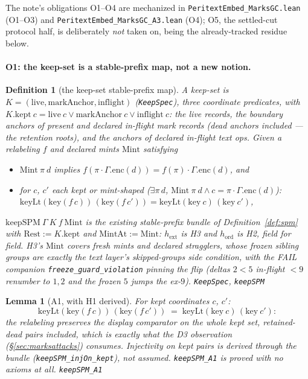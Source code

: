 \documentclass[11pt]{article}
\newtheorem{lemma}[theorem]{Lemma}
\newtheorem{definition}[theorem]{Definition}
\newcommand{\lean}[1]{\texttt{#1}}
\newcommand{\code}[1]{\texttt{#1}}
\begin{document}
The note's obligations O1--O4 are mechanized in
\code{PeritextEmbed\_MarksGC.lean} (O1--O3) and
\code{PeritextEmbed\_MarksGC\_A3.lean} (O4); O5, the settled-cut
protocol half, is deliberately \emph{not} taken on, being the
already-tracked residue below.

\paragraph{O1: the keep-set is a stable-prefix map, not a new
notion.}

\begin{definition}[the keep-set stable-prefix map]
\label{def:keepspm}
A keep-set is $K = (\mathrm{live}, \mathrm{markAnchor},
\mathrm{inflight})$ (\lean{KeepSpec}), three coordinate predicates,
with $K.\mathrm{kept}\ c = \mathrm{live}\ c \vee
\mathrm{markAnchor}\ c \vee \mathrm{inflight}\ c$: the live records,
the boundary anchors of present and declared in-flight mark records
(dead anchors included --- the retention roots), and the anchors of
declared in-flight text ops. Given a relabeling $f$ and declared
mints $\mathrm{Mint}$ satisfying
\begin{itemize}[leftmargin=2em]
\item[($h_{\mathrm{ext}}$)] $\mathrm{Mint}\ \pi\ d$ implies
  $f(\pi \cdot \Gamma.\mathrm{enc}(d)) = f(\pi) \cdot
  \Gamma.\mathrm{enc}(d)$, and
\item[($h_{\mathrm{ord}}$)] for $c$, $c'$ each kept or mint-shaped
  ($\exists \pi\, d$, $\mathrm{Mint}\ \pi\ d \wedge c = \pi \cdot
  \Gamma.\mathrm{enc}(d)$):
  $\mathrm{keyLt}(\mathrm{key}(f\,c))\,(\mathrm{key}(f\,c')) =
  \mathrm{keyLt}(\mathrm{key}\ c)\,(\mathrm{key}\ c')$,
\end{itemize}
$\mathrm{keepSPM}\ \Gamma\ K\ f\ \mathrm{Mint}$ is the
\emph{existing} stable-prefix bundle of Definition~\ref{def:spm} with
$\mathrm{Rest} := K.\mathrm{kept}$ and $\mathrm{MintAt} :=
\mathrm{Mint}$: $h_{\mathrm{ext}}$ is H3 and $h_{\mathrm{ord}}$ is
H2, field for field. H3's $\mathrm{Mint}$ covers fresh mints
\emph{and} declared stragglers, whose frozen sibling groups are
exactly the text layer's skipped-groups side condition, with the FAIL
companion \lean{freeze\_guard\_violation} pinning the flip (deltas
$2 < 5$ in-flight $< 9$ renumber to $1, 2$ and the frozen $5$ jumps
the ex-$9$).
\hfill\lean{KeepSpec}, \lean{keepSPM}
\end{definition}

\begin{lemma}[A1, with H1 derived]
\label{lem:keepa1}
For kept coordinates $c$, $c'$:
\[
  \mathrm{keyLt}(\mathrm{key}(f\,c))\,(\mathrm{key}(f\,c'))
  \;=\; \mathrm{keyLt}(\mathrm{key}\ c)\,(\mathrm{key}\ c') :
\]
the relabeling preserves the display comparator on the whole kept
set, retained-dead pairs included, which is exactly what the D3
observation (\S\ref{sec:marksattacks}) consumes. Injectivity on kept
pairs is derived through the bundle
(\lean{keepSPM\_injOn\_kept}), not assumed. \lean{keepSPM\_A1} is
proved with \emph{no axioms at all}.
\hfill\lean{keepSPM\_A1}
\end{lemma}
\end{document}
